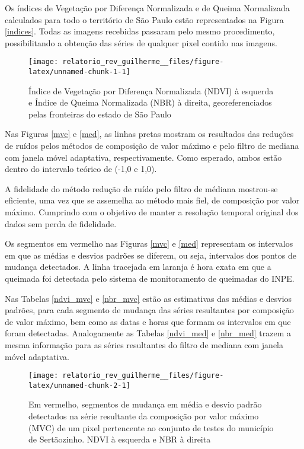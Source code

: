 \documentclass[11pt,brazil,]{article}
\providecommand{\DIFaddbeginFL}{} %
\providecommand{\DIFaddendFL}{} %
\providecommand{\DIFdelbeginFL}{} %
\providecommand{\DIFdelendFL}{} %
\newcommand{\DIFscaledelfig}{0.5}
\newlength{\DIFdelgraphicswidth} %
\newlength{\DIFdelgraphicsheight} %
\newcommand{\DIFaddincludegraphics}[2][]{{\color{blue}\fbox{\DIFOincludegraphics[#1]{#2}}}} %
\newcommand{\DIFdelincludegraphics}[2][]{%
\sbox{\DIFdelgraphicsbox}{\DIFOincludegraphics[#1]{#2}}%
\settoboxwidth{\DIFdelgraphicswidth}{\DIFdelgraphicsbox} %
\settoboxtotalheight{\DIFdelgraphicsheight}{\DIFdelgraphicsbox} %
\scalebox{\DIFscaledelfig}{%
\parbox[b]{\DIFdelgraphicswidth}{\usebox{\DIFdelgraphicsbox}\\[-\baselineskip] \rule{\DIFdelgraphicswidth}{0em}}\llap{\resizebox{\DIFdelgraphicswidth}{\DIFdelgraphicsheight}{%
\setlength{\unitlength}{\DIFdelgraphicswidth}%
\begin{picture}(1,1)%
\thicklines\linethickness{2pt} %
{\color[rgb]{1,0,0}\put(0,0){\framebox(1,1){}}}%
{\color[rgb]{1,0,0}\put(0,0){\line( 1,1){1}}}%
{\color[rgb]{1,0,0}\put(0,1){\line(1,-1){1}}}%
\end{picture}%
}\hspace*{3pt}}} %
} %
\DeclareRobustCommand{\DIFaddbeginFL}{\DIFOaddbeginFL \let\includegraphics\DIFaddincludegraphics} %
\DeclareRobustCommand{\DIFaddendFL}{\DIFOaddendFL \let\includegraphics\DIFOincludegraphics} %
\DeclareRobustCommand{\DIFdelbeginFL}{\DIFOdelbeginFL \let\includegraphics\DIFdelincludegraphics} %
\DeclareRobustCommand{\DIFdelendFL}{\DIFOaddendFL \let\includegraphics\DIFOincludegraphics} %
\begin{document}
Os índices de Vegetação por Diferença Normalizada e de Queima
Normalizada calculados para todo o território de São Paulo estão
representados na Figura \ref{indices}. Todas as imagens recebidas
passaram pelo mesmo procedimento, possibilitando a obtenção das séries
de qualquer pixel contido nas imagens.

\begin{figure}[H]

{\centering \DIFdelbeginFL %
\DIFdelendFL \DIFaddbeginFL \texttt{[image: relatorio\_rev\_guilherme\_\_files/figure-latex/unnamed-chunk-1-1]} 
\DIFaddendFL 

}

\caption{\label{indices} Índice de Vegetação por Diferença Normalizada (NDVI) à esquerda e Índice de Queima Normalizada (NBR) à direita, georeferenciados pelas fronteiras do estado de São Paulo}\label{fig:unnamed-chunk-1}
\end{figure}

Nas Figuras \ref{mvc} e \ref{med}, as linhas pretas mostram os
resultados das reduções de ruídos pelos métodos de composição de valor
máximo e pelo filtro de mediana com janela móvel adaptativa,
respectivamente. Como esperado, ambos estão dentro do intervalo teórico
de (-1,0 e 1,0).

A fidelidade do método redução de ruído pelo filtro de médiana
mostrou-se eficiente, uma vez que se assemelha ao método mais fiel, de
composição por valor máximo. Cumprindo com o objetivo de manter a
resolução temporal original dos dados sem perda de fidelidade.

Os segmentos em vermelho nas Figuras \ref{mvc} e \ref{med} representam
os intervalos em que as médias e desvios padrões se diferem, ou seja,
intervalos dos pontos de mudança detectados. A linha tracejada em
laranja é hora exata em que a queimada foi detectada pelo sistema de
monitoramento de queimadas do INPE.

Nas Tabelas \ref{ndvi_mvc} e \ref{nbr_mvc} estão as estimativas das
médias e desvios padrões, para cada segmento de mudança das séries
resultantes por composição de valor máximo, bem como as datas e horas
que formam os intervalos em que foram detectadas. Analogamente as
Tabelas \ref{ndvi_med} e \ref{nbr_med} trazem a mesma informação para as
séries resultantes do filtro de mediana com janela móvel adaptativa.

\begin{figure}[H]

{\centering \DIFdelbeginFL %
\DIFdelendFL \DIFaddbeginFL \texttt{[image: relatorio\_rev\_guilherme\_\_files/figure-latex/unnamed-chunk-2-1]} 
\DIFaddendFL 

}

\caption{\label{mvc} Em vermelho, segmentos de mudança em média e desvio padrão detectados na série resultante da composição por valor máximo (MVC) de um pixel pertencente ao conjunto de testes do município de Sertãozinho. NDVI à esquerda e NBR à direita}\label{fig:unnamed-chunk-2}
\end{figure}
\end{document}
